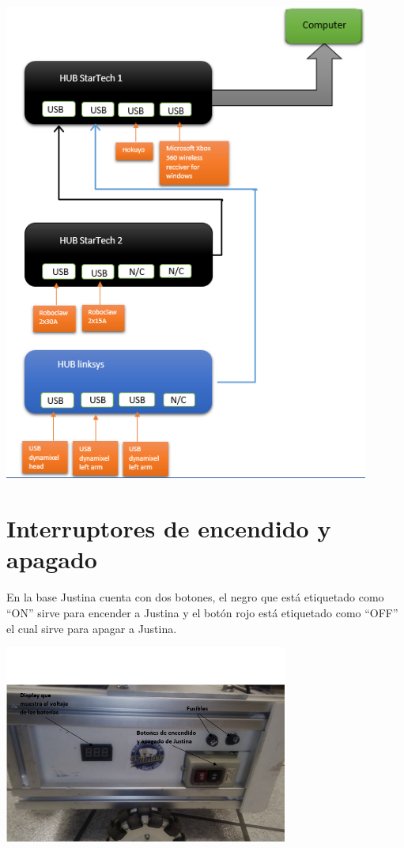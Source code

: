 \documentclass[user_manual.tex]{subfiles}
\begin{document}
\begin{center}
\includegraphics[width=0.9\textwidth]{Figures/Hardware/Diagramas/HUB.png}
\label{fig:Hardware:Diagramas:Justina:HUBs}
\end{center}


\section{Interruptores de encendido y apagado}

En la base Justina cuenta con dos botones, el negro que está etiquetado como ``ON'' sirve para encender a Justina y el botón
rojo está etiquetado como ``OFF'' el cual sirve para apagar a Justina.\\

\begin{center}
\includegraphics[width=0.7\textwidth]{Figures/Hardware/Diagramas/Encendido.png}
\label{fig:Hardware:Diagramas:Justina:Encendido}
\end{center}
\end{document}

